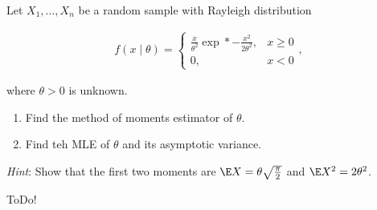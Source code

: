 
\begin{exercise}

Let $X_1, \dots, X_n$ be a random sample with Rayleigh distribution

\begin{align*}
    f(x \mid \theta)
    =
    \begin{cases}
        \frac{x}{\theta^2} \exp*{-\frac{x^2}{2 \theta^2}},
        & x \geq 0 \\
        0,
        & x < 0
    \end{cases},
\end{align*}

where $\theta > 0$ is unknown.

\begin{enumerate}[label = (\alph*)]
    \item Find the method of moments estimator of $\theta$.
    \item Find teh MLE of $\theta$ and its asymptotic variance.
\end{enumerate}

\textit{Hint}:
Show that the first two moments are $\E X = \theta \sqrt \frac{\pi}{2}$ and $\E X^2 = 2 \theta^2$.

\end{exercise}


\begin{solution}

ToDo!

\end{solution}

